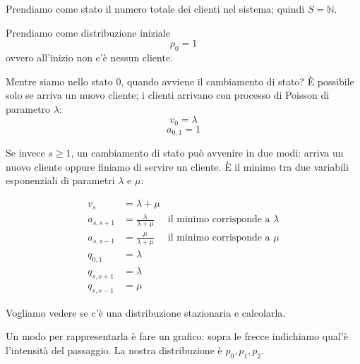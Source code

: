 \documentclass[a4paper,12pt]{book}
\begin{document}
Prendiamo come stato il numero totale dei clienti nel sistema; quindi $ S = \mathbb{N} $. 

Prendiamo come distribuzione iniziale
$$ \rho_0 = 1$$
ovvero all'inizio non c'è nessun cliente. 

Mentre siamo nello stato $ 0 $, quando avviene il cambiamento di stato? È possibile solo se arriva un nuovo cliente; i clienti arrivano con processo di Poisson di parametro $\lambda$:
$$ v_0 = \lambda $$
$$ a_{0,1} = 1 $$

Se invece $ s \ge 1 $, un cambiamento di stato può avvenire in due modi: arriva un nuovo cliente oppure finiamo di servire un cliente. È il minimo tra due variabili esponenziali di parametri $\lambda$ e $\mu$:

\begin{align*}
	v_s & = \lambda + \mu \\
	a_{s,s+1} & = \frac{\lambda}{\lambda + \mu} & \text{il minimo corrisponde a } \lambda \\
	a_{s, s-1} & = \frac{\mu}{\lambda + \mu} & \text{il minimo corrisponde a } \mu \\
	q_{0,1} & = \lambda \\ 
	q_{s,s+1} & = \lambda \\
	 q_{s,s-1} & = \mu
\end{align*}


Vogliamo vedere se c'è una distribuzione stazionaria e calcolarla. 

Un modo per rappresentarla è fare un grafico: sopra le frecce indichiamo qual'è l'intensità del passaggio. La nostra distribuzione è $ p_0, p_1, p_2 $. 
\begin{center}
\end{center}
\end{document}
